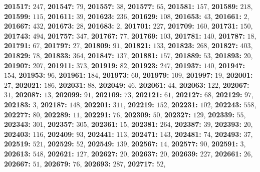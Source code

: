 \textsf{\bfseries 201517:} $247$, \textsf{\bfseries 201547:} $79$, \textsf{\bfseries 201557:} $38$, \textsf{\bfseries 201577:} $65$, \textsf{\bfseries 201581:} $157$, \textsf{\bfseries 201589:} $218$, \textsf{\bfseries 201599:} $115$, \textsf{\bfseries 201611:} $39$, \textsf{\bfseries 201623:} $236$, \textsf{\bfseries 201629:} $108$, \textsf{\bfseries 201653:} $43$, \textsf{\bfseries 201661:} $2$, \textsf{\bfseries 201667:} $432$, \textsf{\bfseries 201673:} $28$, \textsf{\bfseries 201683:} $2$, \textsf{\bfseries 201701:} $227$, \textsf{\bfseries 201709:} $160$, \textsf{\bfseries 201731:} $150$, \textsf{\bfseries 201743:} $494$, \textsf{\bfseries 201757:} $347$, \textsf{\bfseries 201767:} $77$, \textsf{\bfseries 201769:} $103$, \textsf{\bfseries 201781:} $140$, \textsf{\bfseries 201787:} $18$, \textsf{\bfseries 201791:} $67$, \textsf{\bfseries 201797:} $27$, \textsf{\bfseries 201809:} $91$, \textsf{\bfseries 201821:} $133$, \textsf{\bfseries 201823:} $268$, \textsf{\bfseries 201827:} $403$, \textsf{\bfseries 201829:} $78$, \textsf{\bfseries 201833:} $364$, \textsf{\bfseries 201847:} $137$, \textsf{\bfseries 201881:} $157$, \textsf{\bfseries 201889:} $53$, \textsf{\bfseries 201893:} $20$, \textsf{\bfseries 201907:} $207$, \textsf{\bfseries 201911:} $373$, \textsf{\bfseries 201919:} $82$, \textsf{\bfseries 201923:} $247$, \textsf{\bfseries 201937:} $140$, \textsf{\bfseries 201947:} $154$, \textsf{\bfseries 201953:} $96$, \textsf{\bfseries 201961:} $184$, \textsf{\bfseries 201973:} $60$, \textsf{\bfseries 201979:} $109$, \textsf{\bfseries 201997:} $19$, \textsf{\bfseries 202001:} $27$, \textsf{\bfseries 202021:} $186$, \textsf{\bfseries 202031:} $88$, \textsf{\bfseries 202049:} $46$, \textsf{\bfseries 202061:} $44$, \textsf{\bfseries 202063:} $122$, \textsf{\bfseries 202067:} $31$, \textsf{\bfseries 202087:} $13$, \textsf{\bfseries 202099:} $91$, \textsf{\bfseries 202109:} $73$, \textsf{\bfseries 202121:} $61$, \textsf{\bfseries 202127:} $68$, \textsf{\bfseries 202129:} $97$, \textsf{\bfseries 202183:} $3$, \textsf{\bfseries 202187:} $148$, \textsf{\bfseries 202201:} $311$, \textsf{\bfseries 202219:} $152$, \textsf{\bfseries 202231:} $102$, \textsf{\bfseries 202243:} $558$, \textsf{\bfseries 202277:} $80$, \textsf{\bfseries 202289:} $11$, \textsf{\bfseries 202291:} $76$, \textsf{\bfseries 202309:} $50$, \textsf{\bfseries 202327:} $129$, \textsf{\bfseries 202339:} $55$, \textsf{\bfseries 202343:} $301$, \textsf{\bfseries 202357:} $305$, \textsf{\bfseries 202361:} $15$, \textsf{\bfseries 202381:} $264$, \textsf{\bfseries 202387:} $39$, \textsf{\bfseries 202393:} $20$, \textsf{\bfseries 202403:} $116$, \textsf{\bfseries 202409:} $93$, \textsf{\bfseries 202441:} $113$, \textsf{\bfseries 202471:} $143$, \textsf{\bfseries 202481:} $74$, \textsf{\bfseries 202493:} $37$, \textsf{\bfseries 202519:} $521$, \textsf{\bfseries 202529:} $52$, \textsf{\bfseries 202549:} $139$, \textsf{\bfseries 202567:} $14$, \textsf{\bfseries 202577:} $90$, \textsf{\bfseries 202591:} $3$, \textsf{\bfseries 202613:} $548$, \textsf{\bfseries 202621:} $127$, \textsf{\bfseries 202627:} $20$, \textsf{\bfseries 202637:} $20$, \textsf{\bfseries 202639:} $227$, \textsf{\bfseries 202661:} $26$, \textsf{\bfseries 202667:} $51$, \textsf{\bfseries 202679:} $76$, \textsf{\bfseries 202693:} $287$, \textsf{\bfseries 202717:} $52$, 
